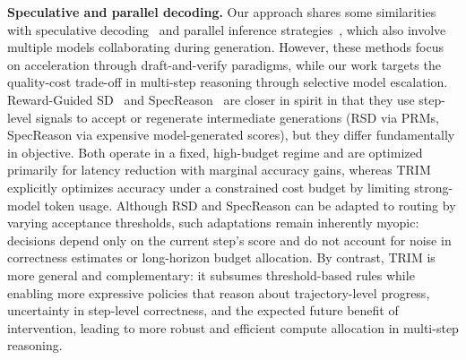 \documentclass{article}
\theoremstyle{plain}
\theoremstyle{definition}
\theoremstyle{remark}
\begin{document}
\textbf{Speculative and parallel decoding.} Our approach shares some similarities with speculative decoding~\citep{speculative} and parallel inference strategies~\citep{medusa}, which also involve multiple models collaborating during generation. However, these methods focus on acceleration through draft-and-verify paradigms, while our work targets the quality-cost trade-off in multi-step reasoning through selective model escalation. Reward-Guided SD~\citep{RSD} and SpecReason~\citep{specreason} are closer in spirit in that they use step-level signals to accept or regenerate intermediate generations (RSD via PRMs, SpecReason via expensive model-generated scores),  but they differ fundamentally in objective. Both operate in a fixed, high-budget regime and are optimized primarily for latency reduction with marginal accuracy gains, whereas TRIM explicitly optimizes accuracy under a constrained cost budget by limiting strong-model token usage.
Although RSD and SpecReason can be adapted to routing by varying acceptance thresholds, such adaptations remain inherently myopic:  decisions depend only on the current step’s score and do not account for noise in correctness estimates or long-horizon budget allocation. By contrast, TRIM is more general and complementary: it subsumes threshold-based rules while enabling more expressive policies that reason about trajectory-level progress, uncertainty in step-level correctness, and the expected future benefit of intervention, leading to more robust and efficient compute allocation in multi-step reasoning.
\end{document}
